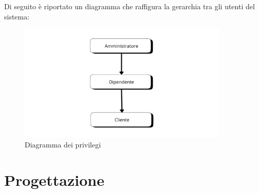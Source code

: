 Di seguito è riportato un diagramma che raffigura la gerarchia tra gli utenti del sistema: 
\begin{figure}[H]
	\centering
  \includegraphics[width=10cm]{assets/diagramma_privilegi.png}
	\caption{Diagramma dei privilegi}
\end{figure}

\newpage
\section{Progettazione}
